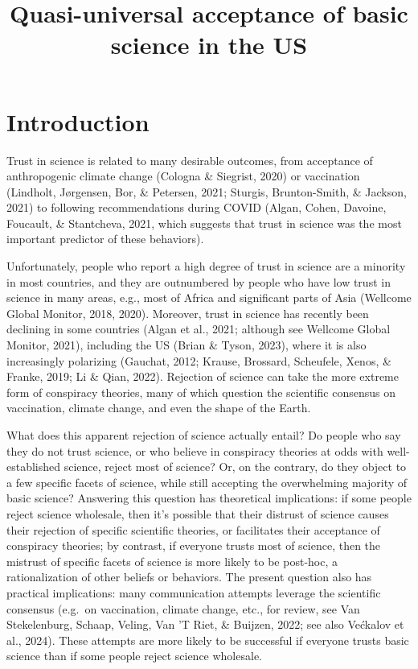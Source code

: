 \documentclass[
  doc,floatsintext]{apa6}
\title{Quasi-universal acceptance of basic science in the US}
\author{\textsuperscript{}}
\date{}
\affiliation{\vspace{0.5cm}\textsuperscript{} }
\begin{document}
\maketitle

\section{Introduction}\label{introduction}

Trust in science is related to many desirable outcomes, from acceptance of anthropogenic climate change (Cologna \& Siegrist, 2020) or vaccination (Lindholt, Jørgensen, Bor, \& Petersen, 2021; Sturgis, Brunton-Smith, \& Jackson, 2021) to following recommendations during COVID (Algan, Cohen, Davoine, Foucault, \& Stantcheva, 2021, which suggests that trust in science was the most important predictor of these behaviors).

Unfortunately, people who report a high degree of trust in science are a minority in most countries, and they are outnumbered by people who have low trust in science in many areas, e.g., most of Africa and significant parts of Asia (Wellcome Global Monitor, 2018, 2020). Moreover, trust in science has recently been declining in some countries (Algan et al., 2021; although see Wellcome Global Monitor, 2021), including the US (Brian \& Tyson, 2023), where it is also increasingly polarizing (Gauchat, 2012; Krause, Brossard, Scheufele, Xenos, \& Franke, 2019; Li \& Qian, 2022). Rejection of science can take the more extreme form of conspiracy theories, many of which question the scientific consensus on vaccination, climate change, and even the shape of the Earth.

What does this apparent rejection of science actually entail? Do people who say they do not trust science, or who believe in conspiracy theories at odds with well-established science, reject most of science? Or, on the contrary, do they object to a few specific facets of science, while still accepting the overwhelming majority of basic science? Answering this question has theoretical implications: if some people reject science wholesale, then it's possible that their distrust of science causes their rejection of specific scientific theories, or facilitates their acceptance of conspiracy theories; by contrast, if everyone trusts most of science, then the mistrust of specific facets of science is more likely to be post-hoc, a rationalization of other beliefs or behaviors. The present question also has practical implications: many communication attempts leverage the scientific consensus (e.g.~on vaccination, climate change, etc., for review, see Van Stekelenburg, Schaap, Veling, Van 'T Riet, \& Buijzen, 2022; see also Većkalov et al., 2024). These attempts are more likely to be successful if everyone trusts basic science than if some people reject science wholesale.
\end{document}
